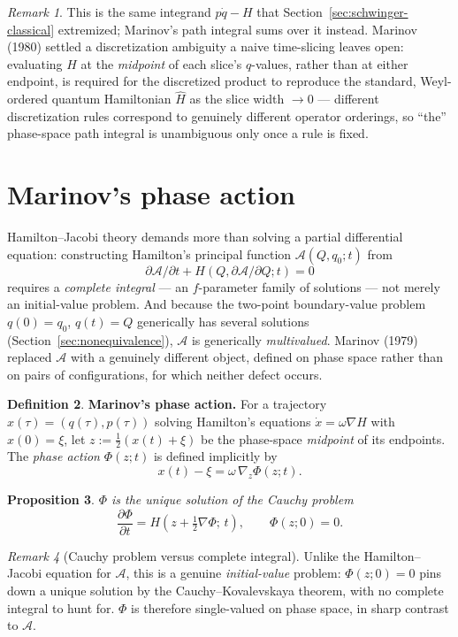 \documentclass[11pt]{book}
\theoremstyle{definition}
\newtheorem{definition}{Definition}[section]
\theoremstyle{plain}
\newtheorem{proposition}[definition]{Proposition}
\theoremstyle{remark}
\newtheorem{remark}[definition]{Remark}
\begin{document}
\begin{remark}
This is the same integrand $p\dot q-H$ that Section~\ref{sec:schwinger-classical} extremized; Marinov's path integral sums over it instead. Marinov (1980) settled a discretization ambiguity a naive time-slicing leaves open: evaluating $H$ at the \emph{midpoint} of each slice's $q$-values, rather than at either endpoint, is required for the discretized product to reproduce the standard, Weyl-ordered quantum Hamiltonian $\hat H$ as the slice width $\to0$ --- different discretization rules correspond to genuinely different operator orderings, so ``the'' phase-space path integral is unambiguous only once a rule is fixed.
\end{remark}

\section{Marinov's phase action}
\label{sec:marinov-phase-action}

Hamilton--Jacobi theory demands more than solving a partial differential equation: constructing Hamilton's principal function $\mathcal A(Q,q_0;t)$ from
\[
\partial\mathcal A/\partial t + H(Q,\partial\mathcal A/\partial Q;t)=0
\]
requires a \emph{complete integral} --- an $f$-parameter family of solutions --- not merely an initial-value problem. And because the two-point boundary-value problem $q(0)=q_0$, $q(t)=Q$ generically has several solutions (Section~\ref{sec:nonequivalence}), $\mathcal A$ is generically \emph{multivalued}. Marinov (1979) replaced $\mathcal A$ with a genuinely different object, defined on phase space rather than on pairs of configurations, for which neither defect occurs.

\begin{definition}
\textbf{Marinov's phase action.} For a trajectory $x(\tau)=(q(\tau),p(\tau))$ solving Hamilton's equations $\dot x=\omega\nabla H$ with $x(0)=\xi$, let $z:=\tfrac12(x(t)+\xi)$ be the phase-space \emph{midpoint} of its endpoints. The \emph{phase action} $\Phi(z;t)$ is defined implicitly by
\[
x(t) - \xi = \omega\,\nabla_z\Phi(z;t) .
\]
\end{definition}

\begin{proposition}
$\Phi$ is the unique solution of the Cauchy problem
\[
\frac{\partial\Phi}{\partial t} = H\!\left(z+\tfrac12\nabla\Phi;\,t\right), \qquad \Phi(z;0)=0 .
\]
\end{proposition}

\begin{remark}[Cauchy problem versus complete integral]
Unlike the Hamilton--Jacobi equation for $\mathcal A$, this is a genuine \emph{initial-value} problem: $\Phi(z;0)=0$ pins down a unique solution by the Cauchy--Kovalevskaya theorem, with no complete integral to hunt for. $\Phi$ is therefore single-valued on phase space, in sharp contrast to $\mathcal A$.
\end{remark}
\end{document}
